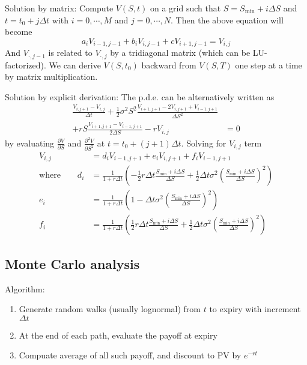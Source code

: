 \documentclass[9pt,twocolumn]{extarticle}
\begin{document}
Solution by matrix: Compute $V(S,t)$ on a grid such that $S=S_{\min} + i\Delta S$
and $t=t_0 + j\Delta t$ with $i=0,\cdots,M$ and $j=0,\cdots,N$. Then the above
equation will become
$$ a_iV_{i-1,j-1} + b_iV_{i,j-1} + cV_{i+1,j-1} = V_{i,j} $$
And $V_{\cdot,j-1}$ is related to $V_{\cdot,j}$ by a tridiagonal matrix (which
can be LU-factorized). We can derive $V(S,t_0)$ backward from $V(S,T)$ one step
at a time by matrix multiplication.

Solution by explicit derivation: The p.d.e. can be alternatively written as
\begin{align*}
\frac{V_{i,j+1}-V_{i,j}}{\Delta t} + 
    \frac{1}{2}\sigma^2S^2\frac{V_{i+1,j+1}-2V_{i,j+1}+V_{i-1,j+1}}{\Delta S^2} & \\ + 
    rS\frac{V_{i+1,j+1}-V_{i-1,j+1}}{2\Delta S}-rV_{i,j} &= 0
\end{align*}
by evaluating $\frac{\partial V}{\partial S}$ and $\frac{\partial^2V}{\partial S^2}$
at $t = t_0+(j+1)\Delta t$. Solving for $V_{i,j}$ term
\begin{align*}
V_{i,j} &= d_i V_{i-1,j+1} + e_i V_{i,j+1} + f_i V_{i-1,j+1} \\
\textrm{where}\qquad
d_i &= \frac{1}{1+r\Delta t}\left(
    -\frac{1}{2} r\Delta t\frac{S_{\min} + i\Delta S}{\Delta S}
    +\frac{1}{2} \Delta t \sigma^2 \left(\frac{S_{\min} + i\Delta S}{\Delta S} \right)^2
\right) \\
e_i &= \frac{1}{1+r\Delta t}\left(
    1-\Delta t\sigma^2 \left(\frac{S_{\min} + i\Delta S}{\Delta S} \right)^2
\right) \\
f_i &= \frac{1}{1+r\Delta t}\left(
    \frac{1}{2} r\Delta t\frac{S_{\min} + i\Delta S}{\Delta S}
    +\frac{1}{2} \Delta t \sigma^2 \left(\frac{S_{\min} + i\Delta S}{\Delta S} \right)^2
\right)
\end{align*}

\subsection*{Monte Carlo analysis}
Algorithm:
\begin{enumerate}
\item Generate random walks (usually lognormal) from $t$ to expiry with increment $\Delta t$
\item At the end of each path, evaluate the payoff at expiry
\item Compuate average of all such payoff, and discount to PV by $e^{-rt}$
\end{enumerate}
\end{document}

